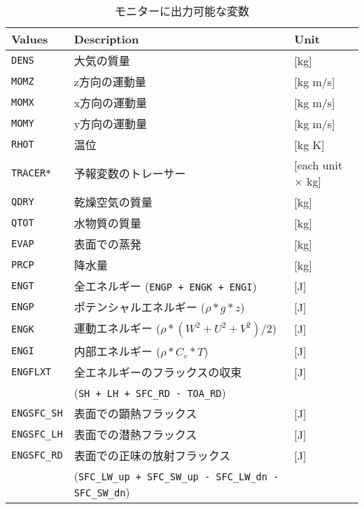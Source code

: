 \begin{table}[h]
\begin{center}
  \caption{モニターに出力可能な変数}
  \label{tab:varlist_monitor}
  \begin{tabularx}{150mm}{|l|X|l|} \hline
    \rowcolor[gray]{0.9}  Values & Description & Unit \\ \hline
      \verb|DENS|         & 大気の質量                                  & [kg]     \\
      \verb|MOMZ|         & z方向の運動量                   & [kg m/s] \\
      \verb|MOMX|         & x方向の運動量                   & [kg m/s] \\
      \verb|MOMY|         & y方向の運動量                   & [kg m/s] \\
      \verb|RHOT|         & 温位                     & [kg K]   \\
      \verb|TRACER*|      & 予報変数のトレーサー            & [each unit $\times$ kg] \\
      \verb|QDRY|         & 乾燥空気の質量                              & [kg] \\
      \verb|QTOT|         & 水物質の質量                                 & [kg] \\
      \verb|EVAP|         & 表面での蒸発                & [kg] \\
      \verb|PRCP|         & 降水量                             & [kg] \\
      \verb|ENGT|         & 全エネルギー (\verb|ENGP + ENGK + ENGI|)  & [J] \\
      \verb|ENGP|         & ポテンシャルエネルギー ($\rho * g * z$)             & [J] \\
      \verb|ENGK|         & 運動エネルギー ($\rho * (W^2+U^2+V^2) / 2$) & [J] \\
      \verb|ENGI|         & 内部エネルギー ($\rho * C_v * T$)           & [J] \\
      \verb|ENGFLXT|      & 全エネルギーのフラックスの収束  & [J] \\
                          & (\verb|SH + LH + SFC_RD - TOA_RD|) & \\
      \verb|ENGSFC_SH|    & 表面での顕熱フラックス                & [J] \\
      \verb|ENGSFC_LH|    & 表面での潜熱フラックス                & [J] \\
      \verb|ENGSFC_RD|    & 表面での正味の放射フラックス                & [J] \\
                          & (\verb|SFC_LW_up + SFC_SW_up - SFC_LW_dn - SFC_SW_dn|) & \\

\end{tabularx}
\end{center}
\end{table}
